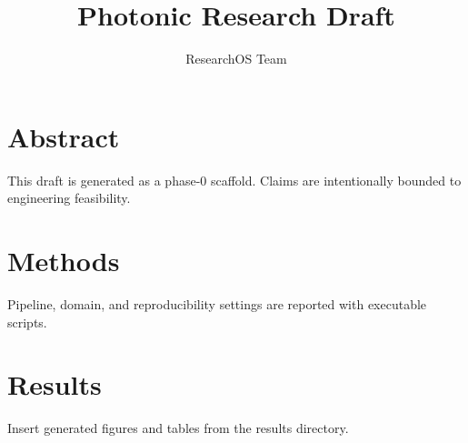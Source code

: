 \documentclass{article}
\title{Photonic Research Draft}
\author{ResearchOS Team}
\begin{document}
\maketitle
\section{Abstract}
This draft is generated as a phase-0 scaffold. Claims are intentionally bounded to engineering feasibility.
\section{Methods}
Pipeline, domain, and reproducibility settings are reported with executable scripts.
\section{Results}
Insert generated figures and tables from the results directory.


\end{document}
